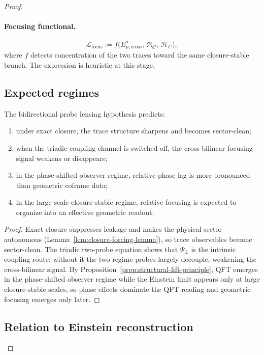 \begin{proof}
\paragraph*{Focusing functional.}
\[
  \mathcal{L}_{\mathrm{focus}}
  :=
  f\!\bigl(
    E^{a}_{\mu,\mathrm{cross}},\,
    \mathfrak{R}_C,\,
    \mathcal{H}_C
  \bigr),
\]
where $f$ detects concentration of the two traces toward the same
closure-stable branch. The expression is heuristic at this stage.

\subsection*{Expected regimes}

\begin{proposition}
\label{prop:expected-probe-lensing-behaviour}
The bidirectional probe lensing hypothesis predicts:
\begin{enumerate}[label=(\roman*)]
  \item under exact closure, the trace structure sharpens and becomes
        sector-clean;
  \item when the triadic coupling channel is switched off, the
        cross-bilinear focusing signal weakens or disappears;
  \item in the phase-shifted observer regime, relative phase lag is more
        pronounced than geometric coframe data;
  \item in the large-scale closure-stable regime, relative focusing is
        expected to organize into an effective geometric readout.
\end{enumerate}
\end{proposition}

\begin{proof}
Exact closure suppresses leakage and makes the physical sector
autonomous (Lemma~\ref{lem:closure-forcing-lemma}), so trace observables
become sector-clean. The triadic two-probe equation shows that
$\Psi_\perp$ is the intrinsic coupling route; without it the two regime
probes largely decouple, weakening the cross-bilinear signal. By
Proposition~\ref{prop:structural-lift-principle}, QFT emerges in the
phase-shifted observer regime while the Einstein limit appears only at
large closure-stable scales, so phase effects dominate the QFT reading
and geometric focusing emerges only later.
\end{proof}

\subsection*{Relation to Einstein reconstruction}


\end{proof}
